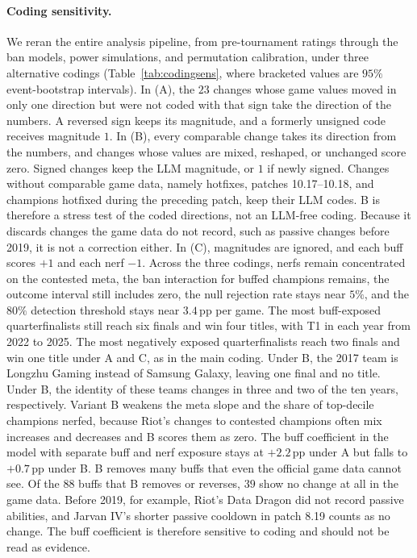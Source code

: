 \documentclass[11pt]{article}
\newcommand{\pp}{\,pp}
\begin{document}
\paragraph{Coding sensitivity.} We reran the entire analysis pipeline, from pre-tournament ratings through the ban models, power simulations, and permutation calibration, under three alternative codings (Table~\ref{tab:codingsens}, where bracketed values are $95\%$ event-bootstrap intervals). In (A), the $23$ changes whose game values moved in only one direction but were not coded with that sign take the direction of the numbers. A reversed sign keeps its magnitude, and a formerly unsigned code receives magnitude $1$. In (B), every comparable change takes its direction from the numbers, and changes whose values are mixed, reshaped, or unchanged score zero. Signed changes keep the LLM magnitude, or $1$ if newly signed. Changes without comparable game data, namely hotfixes, patches 10.17--10.18, and champions hotfixed during the preceding patch, keep their LLM codes. B is therefore a stress test of the coded directions, not an LLM-free coding. Because it discards changes the game data do not record, such as passive changes before 2019, it is not a correction either. In (C), magnitudes are ignored, and each buff scores $+1$ and each nerf $-1$. Across the three codings, nerfs remain concentrated on the contested meta, the ban interaction for buffed champions remains, the outcome interval still includes zero, the null rejection rate stays near $5\%$, and the $80\%$ detection threshold stays near $3.4$\pp{} per game. The most buff-exposed quarterfinalists still reach six finals and win four titles, with T1 in each year from 2022 to 2025. The most negatively exposed quarterfinalists reach two finals and win one title under A and C, as in the main coding. Under B, the 2017 team is Longzhu Gaming instead of Samsung Galaxy, leaving one final and no title. Under B, the identity of these teams changes in three and two of the ten years, respectively. Variant B weakens the meta slope and the share of top-decile champions nerfed, because Riot's changes to contested champions often mix increases and decreases and B scores them as zero. The buff coefficient in the model with separate buff and nerf exposure stays at $+2.2$\pp{} under A but falls to $+0.7$\pp{} under B. B removes many buffs that even the official game data cannot see. Of the $88$ buffs that B removes or reverses, $39$ show no change at all in the game data. Before 2019, for example, Riot's Data Dragon did not record passive abilities, and Jarvan IV's shorter passive cooldown in patch 8.19 counts as no change. The buff coefficient is therefore sensitive to coding and should not be read as evidence.
\end{document}
